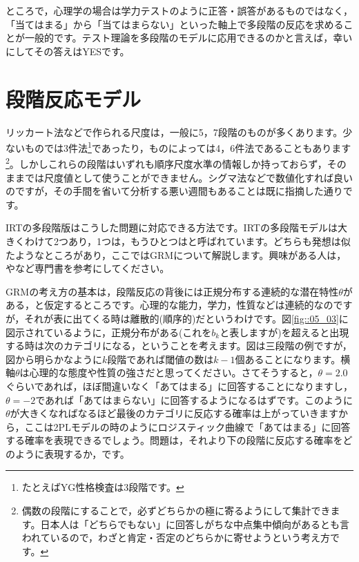 \documentclass{ltjsbook}
\begin{document}
ところで，心理学の場合は学力テストのように正答・誤答があるものではなく，「当てはまる」から「当てはまらない」といった軸上で多段階の反応を求めることが一般的です。テスト理論を多段階のモデルに応用できるのかと言えば，幸いにしてその答えはYESです。
\section{段階反応モデル}
リッカート法などで作られる尺度は，一般に5，7段階のものが多くあります。少ないものでは3件法\footnote{たとえばYG性格検査は3段階です。}であったり，ものによっては4，6件法であることもあります\footnote{偶数の段階にすることで，必ずどちらかの極に寄るようにして集計できます。日本人は「どちらでもない」に回答しがちな中点集中傾向があるとも言われているので，わざと肯定・否定のどちらかに寄せようという考え方です。}。しかしこれらの段階はいずれも順序尺度水準の情報しか持っておらず，そのままでは尺度値として使うことができません。シグマ法などで数値化すれば良いのですが，その手間を省いて分析する悪い週間もあることは既に指摘した通りです。

IRTの多段階版はこうした問題に対応できる方法です。IRTの多段階モデルは大きくわけて2つあり，1つは\citep{samejima1997graded}，もうひとつは\citep{muraki1992generalized}と呼ばれています。どちらも発想は似たようなところがあり，ここではGRMについて解説します。興味がある人は，\citet{豊田秀樹2012-08-24}や\citet{加藤健太郎2014-07-25}など専門書を参考にしてください。

GRMの考え方の基本は，段階反応の背後には正規分布する連続的な潜在特性$\theta$がある，と仮定するところです。心理的な能力，学力，性質などは連続的なのですが，それが表に出てくる時は離散的(順序的)だというわけです。図\ref{fig::05_03}に図示されているように，正規分布がある(これを$b_k$と表しますが)を超えると出現する時は次のカテゴリになる，ということを考えます。図は三段階の例ですが，図から明らかなように$k$段階であれば閾値の数は$k-1$個あることになります。横軸$\theta$は心理的な態度や性質の強さだと思ってください。さてそうすると，$\theta=2.0$ぐらいであれば，ほぼ間違いなく「あてはまる」に回答することになりますし，$\theta=-2$であれば「あてはまらない」に回答するようになるはずです。このように$\theta$が大きくなればなるほど最後のカテゴリに反応する確率は上がっていきますから，ここは2PLモデルの時のようにロジスティック曲線で「あてはまる」に回答する確率を表現できるでしょう。問題は，それより下の段階に反応する確率をどのように表現するか，です。
\end{document}
